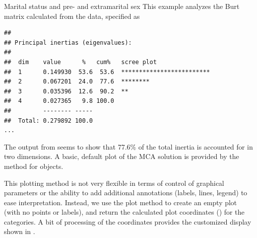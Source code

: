 \documentclass[11pt]{book}
\renewenvironment{knitrout}{\small\renewcommand{\baselinestretch}{.85}}{} %
\begin{document}
\begin{Example}[marital3]{Marital status and pre- and extramarital sex}
This example analyzes the Burt matrix calculated from the 
data, specified as 
\begin{knitrout}
\color{fgcolor}\begin{kframe}
\begin{alltt}
 \hlkwb{<-}  \hlstd{=}\hlstd{,} \hlstd{=}\hlstd{)}
\end{alltt}
\begin{verbatim}
## 
## Principal inertias (eigenvalues):
## 
##  dim    value      %   cum%   scree plot               
##  1      0.149930  53.6  53.6  *************************
##  2      0.067201  24.0  77.6  ********                 
##  3      0.035396  12.6  90.2  **                       
##  4      0.027365   9.8 100.0                           
##         -------- -----                                 
##  Total: 0.279892 100.0                                 
...
\end{verbatim}
\end{kframe}
\end{knitrout}
The output from  seems to show that 77.6\% of the total inertia
is accounted for in two dimensions. A basic, default plot of the MCA solution
is provided by the  method for  objects.
\begin{knitrout}
\color{fgcolor}\begin{kframe}
\begin{alltt}
\end{alltt}
\end{kframe}
\end{knitrout}
This plotting method is not very flexible in terms of control of graphical parameters
or the ability to add additional annotations (labels, lines, legend) to ease
interpretation.  Instead, we use the plot method to create an empty plot
(with no points or labels), and return the calculated plot coordinates ()
for the categories. A bit of processing of the coordinates provides the customized
display shown in .

\begin{knitrout}
\color{fgcolor}\begin{kframe}
\begin{alltt}
 \hlkwb{<-}  \hlstd{=}\hlstd{,} \hlstd{=}\hlstd{,} \hlstd{=}\hlstd{)}


\end{alltt}
\end{kframe}
\end{knitrout}
\end{Example}
\end{document}
